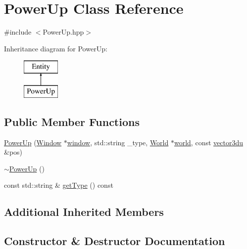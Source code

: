 \hypertarget{class_power_up}{}\section{Power\+Up Class Reference}
\label{class_power_up}


{\ttfamily \#include $<$Power\+Up.\+hpp$>$}

Inheritance diagram for Power\+Up\+:\begin{figure}[H]
\begin{center}
\leavevmode
\includegraphics[height=2.000000cm]{class_power_up}
\end{center}
\end{figure}
\subsection*{Public Member Functions}
\begin{DoxyCompactItemize}
\item 
\mbox{\hyperlink{class_power_up_ab08d7f762be203520f2bddb3d747d2a6}{Power\+Up}} (\mbox{\hyperlink{class_window}{Window}} $\ast$\mbox{\hyperlink{class_entity_a1f2791b6a53a16e200a687f843cee7fb}{window}}, std\+::string \+\_\+type, \mbox{\hyperlink{class_world}{World}} $\ast$\mbox{\hyperlink{class_entity_a038b06c38fe6bb385f37c05a5647c0dc}{world}}, const \mbox{\hyperlink{_utility_8hpp_ac675fa2b6c79d0be47ae76e5d0ce38a8}{vector3du}} \&pos)
\item 
\mbox{\hyperlink{class_power_up_a353053fe27c5a148a2fcd4f5f45e19af}{$\sim$\+Power\+Up}} ()
\item 
const std\+::string \& \mbox{\hyperlink{class_power_up_a88cb880f43bd244bd5d9f236d9b13aed}{get\+Type}} () const
\end{DoxyCompactItemize}
\subsection*{Additional Inherited Members}


\subsection{Constructor \& Destructor Documentation}
\mbox{\label{class_power_up_ab08d7f762be203520f2bddb3d747d2a6}} 
